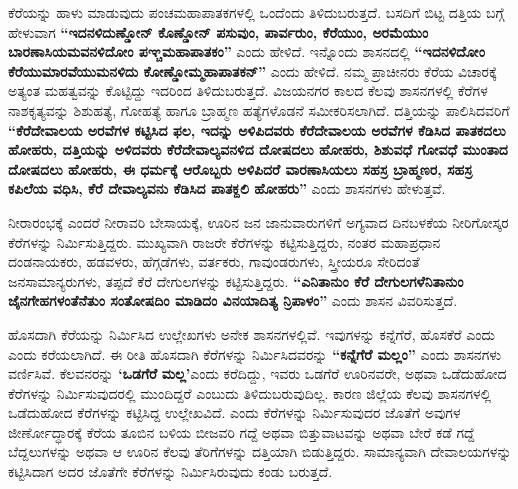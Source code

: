 ಕೆರೆಯನ್ನು ಹಾಳು ಮಾಡುವುದು ಪಂಚಮಹಾಪಾತಕಗಳಲ್ಲಿ ಒಂದೆಂದು ತಿಳಿದುಬರುತ್ತದೆ. ಬಸದಿಗೆ ಬಿಟ್ಟ ದತ್ತಿಯ ಬಗ್ಗೆ ಹೇಳುವಾಗ \textbf{“ಇದನಳಿದುಣ್ಡೋನ್​ ಕೊಣ್ಡೋನ್​ ಪಸುವುಂ, ಪಾರ್ವರುಂ, ಕೆರೆಯುಂ, ಅರಮೆಯುಂ\general{\break } ಬಾರಣಾಸಿಯಮವನಳಿದೋಂ ಪಞ್ಚಮಹಾಪಾತಕಂ”} ಎಂದು ಹೇಳಿದೆ. ಇನ್ನೊಂದು ಶಾಸನದಲ್ಲಿ \textbf{“ಇದನಳಿದೋಂ ಕೆರೆಯುಮಾರವೆಯುಮನಳಿದು ಕೋಣ್ಡೋಮ್ಮಹಾಪಾತಕನ್​”} ಎಂದು ಹೇಳಿದೆ. ನಮ್ಮ ಪ್ರಾಚೀನರು ಕೆರೆಯ ವಿಚಾರಕ್ಕೆ ಅತ್ಯಂತ ಮಹತ್ವವನ್ನು ಕೊಟ್ಟಿದ್ದು ಇದರಿಂದ ತಿಳಿದುಬರುತ್ತದೆ. ವಿಜಯನಗರ ಕಾಲದ ಕೆಲವು ಶಾಸನಗಳಲ್ಲಿ ಕೆರೆಗಳ ನಾಶಕೃತ್ಯವನ್ನು ಶಿಶುಹತ್ಯೆ, ಗೋಹತ್ಯೆ ಹಾಗೂ ಬ್ರಾಹ್ಮಣ ಹತ್ಯೆಗಳೊಡನೆ ಸಮೀಕರಿಸಲಾಗಿದೆ. ದತ್ತಿಯನ್ನು ಪಾಲಿಸಿದವರಿಗೆ \textbf{“ಕೆರೆದೇವಾಲಯ ಅರವೆಗಳ ಕಟ್ಟಿಸಿದ ಫಲ, ಇದನ್ನು ಅಳಿಪಿದವರು ಕೆರೆದೇವಾಲಯ ಅರವೆಗಳ ಕೆಡಿಸಿದ ಪಾತಕದಲು ಹೋಹರು, ದತ್ತಿಯನ್ನು ಅಳಿದವರು ಕೆರೆದೇವಾಲ್ಯವನಳಿದ ದೋಷದಲು ಹೋಹರು, ಶಿಶುವಧೆ ಗೋವಧೆ ಮುಂತಾದ ದೋಷದಲು ಹೋಹರು, ಈ ಧರ್ಮಕ್ಕೆ ಆರೊಬ್ಬರು ಅಳಿಪಿದರೆ ವಾರಣಾಸಿಯಲು ಸಹಸ್ರ ಬ್ರಾಹ್ಮಣರ, ಸಹಸ್ರ ಕಪಿಲೆಯ ವಧಿಸಿ, ಕೆರೆ ದೇವಾಲ್ಯವನು ಕೆಡಿಸಿದ ಪಾತಕ್ದಲಿ ಹೋಹರು”} ಎಂದು ಶಾಸನಗಳು ಹೇಳುತ್ತವೆ.

ನೀರಾರಂಭಕ್ಕೆ ಎಂದರೆ ನೀರಾವರಿ ಬೇಸಾಯಕ್ಕೆ, ಊರಿನ ಜನ ಜಾನುವಾರುಗಳಿಗೆ ಅಗ್ಯವಾದ ದಿನಬಳಕೆಯ ನೀರಿಗೋಸ್ಕರ ಕೆರೆಗಳನ್ನು ನಿರ್ಮಿಸುತ್ತಿದ್ದರು. ಮುಖ್ಯವಾಗಿ ರಾಜರೇ ಕೆರೆಗಳನ್ನು ಕಟ್ಟಿಸುತ್ತಿದ್ದರು, ನಂತರ ಮಹಾಪ್ರಧಾನ ದಂಡನಾಯಕರು, ಹಡವಳರು, ಹೆಗ್ಗಡೆಗಳು, ವರ್ತಕರು, ಗಾವುಂಡರುಗಳು, ಸ್ತ್ರೀಯರೂ ಸೇರಿದಂತೆ ಜನಸಾಮಾನ್ಯರುಗಳು, ತಪ್ಪದೆ ಕೆರೆ ದೇಗುಲಗಳನ್ನು ಕಟ್ಟಿಸುತ್ತಿದ್ದರು. \textbf{“ಎನಿತಾನುಂ ಕೆರೆ ದೇಗುಲಗಳೆನಿತಾನುಂ ಜೈನಗೇಹಗಳಂತೆನೆತುಂ ಸಂತೋಷದಿಂ ಮಾಡಿದಂ ವಿನಯಾದಿತ್ಯ ನ್ರಿಪಾಳಂ”} ಎಂದು ಶಾಸನ ವಿವರಿಸುತ್ತದೆ.

ಹೊಸದಾಗಿ ಕೆರೆಯನ್ನು ನಿರ್ಮಿಸಿದ ಉಲ್ಲೇಖಗಳು ಅನೇಕ ಶಾಸನಗಳಲ್ಲಿವೆ. ಇವುಗಳನ್ನು ಕನ್ನೆಗೆರೆ, ಹೊಸಕೆರೆ ಎಂದು ಎಂದು ಕರೆಯಲಾಗಿದೆ. ಈ ರೀತಿ ಹೊಸದಾಗಿ ಕೆರೆಗಳನ್ನು ನಿರ್ಮಿಸಿದವರನ್ನು \textbf{“ಕನ್ನೆಗೆರೆ ಮಲ್ಲಂ”} ಎಂದು ಶಾಸನಗಳು ವರ್ಣಿಸಿವೆ. ಕೆಲವನರನ್ನು \textbf{‘ಒಡಗೆರೆ} \textbf{ಮಲ್ಲ’}ಎಂದು ಕರೆದಿದ್ದು, ಇವರು ಒಡಗೆರೆ ಊರಿನವರೇ, ಅಥವಾ ಒಡೆದುಹೋದ ಕೆರೆಗಳನ್ನು ನಿರ್ಮಿಸುವುದರಲ್ಲಿ ಮುಂದಿದ್ದರೆ ಎಂಬುದು ತಿಳಿದುಬರುವುದಿಲ್ಲ. ಕಾರಣ ಜಿಲ್ಲೆಯ ಕೆಲವು ಶಾಸನಗಳಲ್ಲಿ ಒಡೆದುಹೋದ ಕೆರೆಗಳನ್ನು ಕಟ್ಟಿಸಿದ್ದ ಉಲ್ಲೇಖವಿದೆ. ಎಂದು ಕೆರೆಗಳನ್ನು ನಿರ್ಮಿಸುವುದರ ಜೊತೆಗೆ ಅವುಗಳ ಜೀರ್ಣೋದ್ಧಾರಕ್ಕೆ ಕೆರೆಯ ತೂಬಿನ ಬಳಿಯ ಬೀಜವರಿ ಗದ್ದೆ ಅಥವಾ ಬಿತ್ತುವಾಟವನ್ನು ಅಥವಾ ಬೇರೆ ಕಡೆ ಗದ್ದೆ ಬೆದ್ದಲುಗಳನ್ನು ಅಥವಾ ಆ ಊರಿನ ಕೆಲವು ತೆರಿಗೆಗಳನ್ನು ದತ್ತಿಯಾಗಿ ಬಿಡುತ್ತಿದ್ದರು. ಸಾಮಾನ್ಯವಾಗಿ ದೇವಾಲಯಗಳನ್ನು ಕಟ್ಟಿಸಿದಾಗ ಅದರ ಜೊತೆಗೇ ಕೆರೆಗಳನ್ನು ನಿರ್ಮಿಸಿರುವುದು ಕಂಡು ಬರುತ್ತದೆ.

